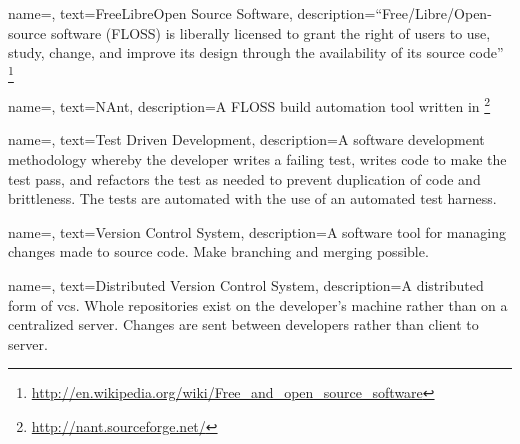 
{
name=,
text=Free\/\-Libre\/\-Open Source Software,
description={``Free/\-Libre/\-Open-\-source software (FLOSS) is liberally licensed to grant the right of users to use, study, change, and improve its design through the availability of its source code'' \footnote{\url{http://en.wikipedia.org/wiki/Free_and_open_source_software}}}
}


{
name=,
text=NAnt,
description={A \gls{FLOSS} build automation tool written in \CSharp\footnote{\url{http://nant.sourceforge.net/}}}
}


{
name=,
text=Test Driven Development,
description={A software development methodology whereby the developer writes a failing test, writes code to make the test pass, and refactors the test as needed to prevent duplication of code and brittleness. The tests are automated with the use of an automated test harness.}
}
	

{
name=,
text=Version Control System,
description={A software tool for managing changes made to source code. Make \gls{branching} and \gls{merging} possible.}
}


{
name=,
text=Distributed Version Control System,
description={A distributed form of \gls{vcs}. Whole repositories exist on the developer's machine rather than on a centralized server. Changes are sent between developers rather than client to server.}
}

